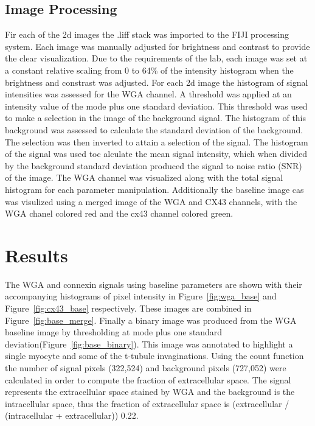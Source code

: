 \documentclass[12pt]{article}
\begin{document}
\subsection{Image Processing}
Fir each of the 2d images the .liff stack was imported to the FIJI processing system. Each image was manually adjusted for brightness and contrast to provide the clear visualization. Due to the requirements of the lab, each image was set at a constant relative scaling from 0 to 64\% of the intensity histogram when the brightness and constrast was adjusted. For each 2d image the histogram of signal intensities was assessed for the WGA channel. A threshold was applied at an intensity value of the mode plus one standard deviation. This threshold was used to make a selection in the image of the background signal. The histogram of this background was assessed to calculate the standard deviation of the background. The selection was then inverted to attain a selection of the signal. The histogram of the signal was used toc alculate the mean signal intensity, which when divided by the background standard deviation produced the signal to noise ratio (SNR) of the image. The WGA channel was visualized along with the total signal histogram for each parameter manipulation. Additionally the baseline image cas was visulized using a merged image of the WGA and CX43 channels, with the WGA chanel colored red and the cx43 channel colored green.


\section{Results}
The WGA and connexin signals using baseline parameters are shown with their accompanying histograms of pixel intensity in Figure~\ref{fig:wga_base} and Figure~\ref{fig:cx43_base} respectively. These images are combined in Figure~\ref{fig:base_merge}. Finally a binary image was produced from the WGA baseline image by thresholding at mode plus one standard deviation(Figure~\ref{fig:base_binary}). This image was annotated to highlight a single myocyte and some of the t-tubule invaginations. Using the count function the number of signal pixels (322,524) and background pixels (727,052) were calculated in order to compute the fraction of extracellular space. The signal represents the extracellular space stained by WGA and the background is the intracellular space, thus the fraction of extracellular space is (extracellular / (intracellular + extracellular)) 0.22.
\end{document}
